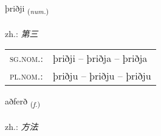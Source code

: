 \documentclass[frontgrid, backgrid]{flacards}\usepackage[]{graphicx}\usepackage[]{xcolor}
\begin{document}
\renewcommand{\blhead}{\vskip5pt {\small\bfseries\footnotesize Töluorð | 数量词 }}
\renewcommand{\bcfoot}{\vskip5pt \hspace{2pt}{\small\bfseries\footnotesize 1K}}


{þriðji \small{\textsubscript{(\textit{num.})}} \\[1ex] %
\textphonetic{[θrɪðjɪ]} \\
zh.: \emph{第三} \\  [2ex]
\renewcommand*{\arraystretch}{0.8}
\begin{tabular}{ll}
\textsc{sg.nom.}: & þriðji  --  þriðja -- þriðja \\ 
\textsc{pl.nom.}: & þriðju -- þriðju -- þriðju
\end{tabular}
}

\renewcommand{\flhead}{\vskip5pt \fboxsep=0pt {\small\bfseries\footnotesize Nafnorð | 名词}}
\renewcommand{\fcfoot}{\vskip5pt \fboxsep=0pt \hspace{2pt}{\small\bfseries\footnotesize 1K}}

\renewcommand{\blhead}{\vskip5pt {\small\bfseries\footnotesize Nafnorð | 名词 }}
\renewcommand{\bcfoot}{\vskip5pt \hspace{2pt}{\small\bfseries\footnotesize 1K}}


{aðferð \small{\textsubscript{(\textit{f.})}} \\[1ex] %
\textphonetic{[aðfɛrð]} \\
zh.: \emph{方法} \\  [2ex]
\renewcommand*{\arraystretch}{0.8}
}

\renewcommand{\flhead}{\vskip5pt \fboxsep=0pt {\small\bfseries\footnotesize Fornafn | 代词}}
\renewcommand{\fcfoot}{\vskip5pt \fboxsep=0pt \hspace{2pt}{\small\bfseries\footnotesize 1K}}
\end{document}
